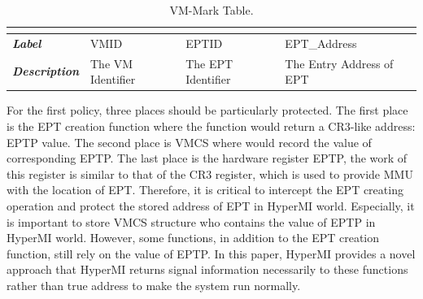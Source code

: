 \documentclass[conference]{IEEEtran}
\begin{document}
\begin{table}[htbp]
\centering
\caption{VM-Mark Table.}\label{tab1}
\begin{tabular}{p{1.4cm}|p{1.2cm}|p{1.1cm}|p{1.7cm}}
\hline
\multicolumn{4}{c}{\bfseries\textbf\centering{VM-Mark Table}}\\
\hline
{\itshape\bfseries Label} & VMID & EPTID & EPT\_Address\\
\hline
{\itshape\bfseries Description} & { The VM Identifier} & The EPT Identifier & The Entry Address of EPT\\
\hline
\end{tabular}
\end{table}

For the first policy, three places should be particularly protected. The first place is the EPT creation function where the function would return a CR3-like address: EPTP value. The second place is VMCS where would record the value of corresponding EPTP. The last place is the hardware register EPTP, the work of this register is similar to that of the CR3 register, which is used to provide MMU with the location of EPT. 
Therefore, it is critical to intercept the EPT creating operation and protect the stored address of EPT in HyperMI world. Especially, it is important to store VMCS structure who contains the value of EPTP in HyperMI world. 
However, some functions, in addition to the EPT creation function, still rely on the value of EPTP. In this paper, HyperMI provides a novel approach that HyperMI returns signal information necessarily to these functions rather than true address to make the system run normally. 
\end{document}
